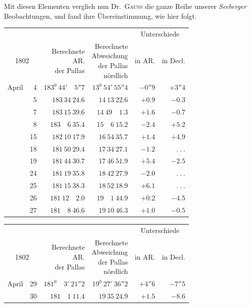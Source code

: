 Mit diesen Elementen verglich nun Dr.\ \textsc{Gauss} die ganze Reihe unserer \textit{Seeberger} Beobachtungen, und fand ihre Übereinstimmung, wie hier folgt.
\begin{center}
{\small\setlength{\tabcolsep}{5pt}
\begin{tabular}{r r|r|r|r|r}
\multicolumn{2}{c|}{}&&&\multicolumn{2}{c}{Unterschiede}\\
\multicolumn{2}{c|}{1802}&\shortstack{Berechnete\\AR.\\der Pallas}&\shortstack{Berechnete\\Abweichung\\der Pallas\\nördlich}&in AR.&in Decl.\\\hline
April&4&$183^0\ 44'\quad5''7$&$13^0\ 54'\ 55''4$&$-0''9$&$+3''4$\\
&5&$183\ 34\ 24.6$&$14\ 13\ 22.6$&$+0.9$&$-0.3$\\
&7&$183\ 15\ 39.6$&$14\ 49\quad1.3$&$+1.6$&$-0.7$\\
&8&$183\quad6\ 35.4$&$15\quad6\ 15.2$&$-2.4$&$+5.2$\\
&15&$182\ 10\ 17.9$&$16\ 54\ 35.7$&$+1.4$&$+4.9$\\
&18&$181\ 50\ 29.4$&$17\ 34\ 27.1$&$-1.2$&$\ .\ .\ .$\\
&19&$181\ 44\ 30.7$&$17\ 46\ 51.9$&$+5.4$&$-2.5$\\
&24&$181\ 19\ 35.8$&$18\ 42\ 27.9$&$-2.0$&$\ .\ .\ .$\\
&25&$181\ 15\ 38.3$&$18\ 52\ 18.9$&$+6.1$&$\ .\ .\ .$\\
&26&$181\ 12\quad2.0$&$19\quad1\ 44.9$&$+0.2$&$-4.5$\\
&27&$181\quad8\ 46.6$&$19\ 10\ 46.3$&$+1.0$&$-0.5$
\end{tabular}
\par\medskip
\begin{tabular}{r r|r|r|r|r}
\multicolumn{2}{c|}{}&&&\multicolumn{2}{c}{Unterschiede}\\
\multicolumn{2}{c|}{1802}&\shortstack{Berechnete\\AR.\\der Pallas}&\shortstack{Berechnete\\Abweichung\\der Pallas\\nördlich}&in AR.&in Decl.\\\hline
April&29&$181^0\quad3'\ 21''2$&$19^0\ 27'\ 36''2$&$+4''6$&$-7''5$\\
&30&$181\quad1\ 11.4$&$19\ 35\ 24.9$&$+1.5$&$-8.6$\\

\end{tabular}}
\end{center}
